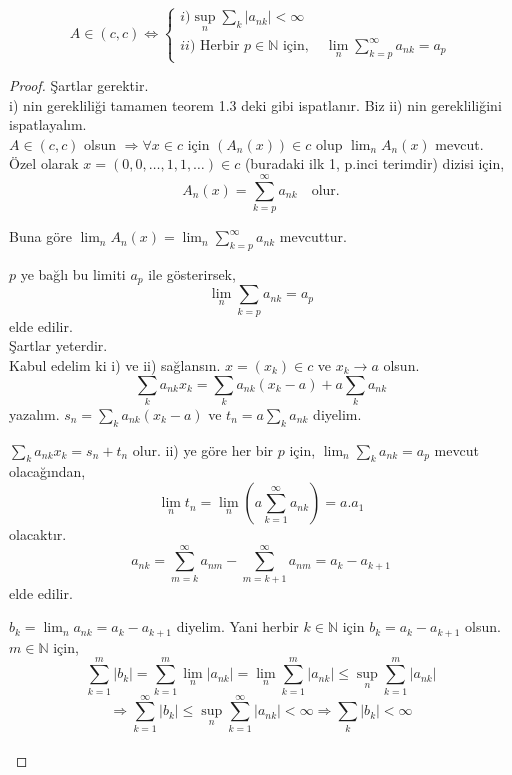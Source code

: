 \begin{theorem}
$$
A\in(c,c)\iff
\begin{cases}
i) \sup_n\sum\limits_k|a_{nk}|<\infty\\
ii)\text{ Herbir }p\in\mathbb{N}\text{ için},\quad\lim_n\sum\limits_{k=p}^\infty a_{nk}=a_p
\end{cases}
$$
\end{theorem}
\begin{proof}
Şartlar gerektir.\\[5pt]
i) nin gerekliliği tamamen teorem 1.3 deki gibi ispatlanır. Biz ii) nin gerekliliğini ispatlayalım.\\[5pt]

$A\in(c,c)$ olsun $\Rightarrow\forall x\in c$ için $(A_n(x))\in c$ olup $\lim_nA_n(x)$ mevcut. Özel olarak $x=(0,0,\ldots,1,1,\ldots)\in c$ (buradaki ilk 1, p.inci terimdir) dizisi için,
$$
A_n(x)=\sum\limits_{k=p}^\infty a_{nk}\quad\text{olur.}
$$

Buna göre $\lim_nA_n(x)=\lim_n\sum\limits_{k=p}^\infty a_{nk}$ mevcuttur.

$p$  ye bağlı bu limiti $a_p$ ile gösterirsek, $$\lim_n\sum\limits_{k=p}a_{nk}=a_p$$ elde edilir.\\[5pt]

Şartlar yeterdir.\\[5pt]

Kabul edelim ki i) ve ii) sağlansın. $x=(x_k)\in c$ ve $x_k\to a$ olsun.
$$
\sum_ka_{nk}x_k=\sum_ka_{nk}(x_k-a)+a\sum_ka_{nk}
$$
yazalım. $s_n=\sum\limits_ka_{nk}(x_k-a)$ ve $t_n=a\sum\limits_ka_{nk}$ diyelim.

$\sum\limits_ka_{nk}x_k=s_n+t_n$ olur. ii) ye göre her bir $p$ için, $\lim_n\sum\limits_ka_{nk}=a_p$ mevcut olacağından,
$$
\lim_nt_n=\lim_n(a\sum\limits_{k=1}^\infty a_{nk})=a.a_1
$$
olacaktır.
$$
a_{nk}=\sum\limits_{m=k}^\infty a_{nm}-\sum\limits_{m=k+1}^\infty a_{nm}=a_k-a_{k+1}
$$
elde edilir.

$b_k=\lim_na_{nk}=a_k-a_{k+1}$ diyelim. Yani herbir $k\in\mathbb{N}$ için $b_k=a_k-a_{k+1}$ olsun. $m\in\mathbb{N}$ için,
$$
\sum\limits_{k=1}^m |b_k|=\sum\limits_{k=1}^m\lim_n|a_{nk}|=\lim_n\sum\limits_{k=1}^m|a_{nk}|\leq\sup_n\sum\limits_{k=1}^m|a_{nk}|
$$
$$
\Rightarrow\sum\limits_{k=1}^\infty|b_k|\leq\sup_n\sum\limits_{k=1}^\infty|a_{nk}|<\infty\Rightarrow\sum_k|b_k|<\infty
$$\\[5pt]


\end{proof}
